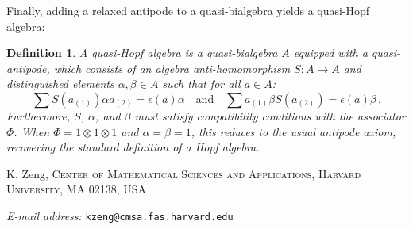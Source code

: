 \documentclass[11pt]{article}
\numberwithin{equation}{section}
\newtheorem{definition}{Definition}[section]
\begin{document}
Finally, adding a relaxed antipode to a quasi-bialgebra yields a quasi-Hopf algebra:

\begin{definition}
A \emph{quasi-Hopf algebra} is a quasi-bialgebra $A$ equipped with a quasi-antipode, which consists of an algebra anti-homomorphism $S: A \to A$ and distinguished elements $\alpha, \beta \in A$ such that for all $a \in A$:
\begin{equation}
    \sum S(a_{(1)}) \alpha a_{(2)} = \epsilon(a) \alpha \quad \text{and} \quad \sum a_{(1)} \beta S(a_{(2)}) = \epsilon(a) \beta\,.
\end{equation}
Furthermore, $S$, $\alpha$, and $\beta$ must satisfy compatibility conditions with the associator $\Phi$. When $\Phi = 1 \otimes 1 \otimes 1$ and $\alpha=\beta=1$, this reduces to the usual antipode axiom, recovering the standard definition of a Hopf algebra.
\end{definition}





 \bigskip
\footnotesize

K. Zeng, \textsc{	Center of Mathematical Sciences and Applications, Harvard University, MA 02138, USA}\par\nopagebreak
\textit{E-mail address:} \texttt{kzeng@cmsa.fas.harvard.edu}
\end{document}
